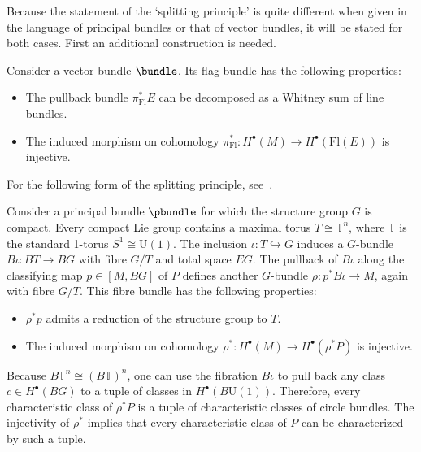    Because the statement of the `splitting principle' is quite different when given in the language of principal bundles or that of vector bundles, it will be stated for both cases. First an additional construction is needed.
    \begin{theorem}
        Consider a vector bundle $\bundle$. Its flag bundle has the following properties:
        \begin{itemize}
            \item The pullback bundle $\pi_{\text{Fl}}^*E$ can be decomposed as a Whitney sum of line bundles.
            \item The induced morphism on cohomology $\pi_{\text{Fl}}^*:H^\bullet(M)\rightarrow H^\bullet(\mathrm{Fl}(E))$ is injective.
        \end{itemize}
    \end{theorem}
    For the following form of the splitting principle, see~\citet{may_note_2005,debray_characteristic_2018}.
    \begin{theorem}
        Consider a principal bundle $\pbundle$ for which the structure group $G$ is compact. Every compact Lie group contains a maximal torus $T\cong\mathbb{T}^n$, where $\mathbb{T}$ is the standard 1-torus $S^1\cong\mathrm{U}(1)$. The inclusion $\iota:T\hookrightarrow G$ induces a $G$-bundle $B\iota:BT\rightarrow BG$ with fibre $G/T$ and total space $EG$. The pullback of $B\iota$ along the classifying map $p\in[M,BG]$ of $P$ defines another $G$-bundle $\rho:p^*B\iota\rightarrow M$, again with fibre $G/T$. This fibre bundle has the following properties:
        \begin{itemize}
            \item $\rho^*p$ admits a reduction of the structure group to $T$.
            \item The induced morphism on cohomology $\rho^*:H^\bullet(M)\rightarrow H^\bullet(\rho^*P)$ is injective.
        \end{itemize}
    \end{theorem}
    Because $B\mathbb{T}^n\cong(B\mathbb{T})^n$, one can use the fibration $B\iota$ to pull back any class $c\in H^\bullet(BG)$ to a tuple of classes in $H^\bullet(B\mathrm{U}(1))$. Therefore, every characteristic class of $\rho^*P$ is a tuple of characteristic classes of circle bundles. The injectivity of $\rho^*$ implies that every characteristic class of $P$ can be characterized by such a tuple.

